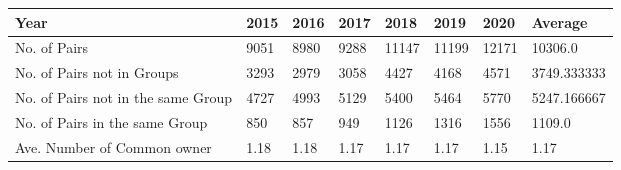 \begin{tabular}{llllllll}
\toprule
Year &  2015 &  2016 &  2017 &   2018 &   2019 &   2020 &      Average \\
\midrule
No. of Pairs                       &  9051 &  8980 &  9288 &  11147 &  11199 &  12171 &      10306.0 \\
No. of Pairs not in Groups         &  3293 &  2979 &  3058 &   4427 &   4168 &   4571 &  3749.333333 \\
No. of Pairs not in the same Group &  4727 &  4993 &  5129 &   5400 &   5464 &   5770 &  5247.166667 \\
No. of Pairs in the same Group     &   850 &   857 &   949 &   1126 &   1316 &   1556 &       1109.0 \\
Ave. Number of Common owner        &  1.18 &  1.18 &  1.17 &   1.17 &   1.17 &   1.15 &         1.17 \\
\bottomrule
\end{tabular}
